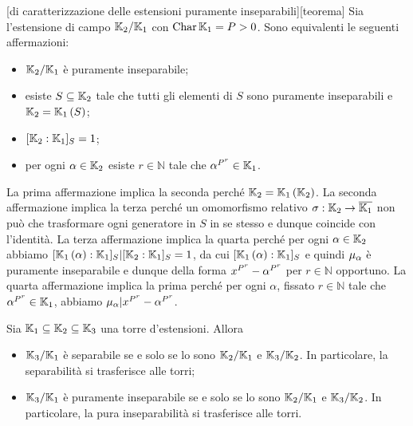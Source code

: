 \begin{Theorem}
	[di caratterizzazione delle estensioni puramente inseparabili][teorema] Sia l'estensione di campo $\mathbb{K}_2/\mathbb{K}_1$ con $\operatorname{Char}{\mathbb{K}_1} = P > 0$. Sono equivalenti le seguenti affermazioni:
	\begin{itemize}
		\item $\mathbb{K}_2/\mathbb{K}_1$ \`e puramente inseparabile;
		\item esiste $S \subseteq \mathbb{K}_2$ tale che tutti gli elementi di $S$ sono puramente inseparabili e $\mathbb{K}_2 = \mathbb{K}_1 \left ( S \right )$;
		\item $[\mathbb{K}_2:\mathbb{K}_1]_S = 1$;
		\item per ogni $\alpha \in \mathbb{K}_2$ esiste $r \in \mathbb{N}$ tale che $\alpha^{P^r} \in \mathbb{K}_1$.
	\end{itemize}
\end{Theorem}
\Proof La prima affermazione implica la seconda perch\'e $\mathbb{K}_2 = \mathbb{K}_1 \left ( \mathbb{K}_2 \right )$. La seconda affermazione implica la terza perch\'e un omomorfismo relativo $\sigma: \mathbb{K}_2 \rightarrow \overline{\mathbb{K}_1}$ non pu\`o che trasformare ogni generatore in $S$ in se stesso e dunque coincide con l'identit\`a. La terza affermazione implica la quarta perch\'e per ogni $\alpha \in \mathbb{K}_2$ abbiamo $[\mathbb{K}_1 \left ( \alpha \right ):\mathbb{K}_1]_S | [\mathbb{K}_2:\mathbb{K}_1]_S = 1$, da cui $[\mathbb{K}_1 \left ( \alpha \right ):\mathbb{K}_1]_S$ e quindi $\MinimalPolynomial{\alpha}$ \`e puramente inseparabile e dunque della forma $x^{P^r} - \alpha^{P^r}$ per $r \in \mathbb{N}$ opportuno. La quarta affermazione implica la prima perch\'e per ogni $\alpha$, fissato $r \in \mathbb{N}$ tale che $\alpha^{P^r} \in \mathbb{K}_1$, abbiamo $\MinimalPolynomial{\alpha} | x^{\Prime^r} - \alpha^{\Prime^r}$. \EndProof
\begin{Theorem}
	Sia $\mathbb{K}_1 \subseteq \mathbb{K}_2 \subseteq \mathbb{K}_3$ una torre d'estensioni. Allora
	\begin{itemize}
		\item $\mathbb{K}_3/\mathbb{K}_1$ \`e separabile se e solo se lo sono $\mathbb{K}_2/\mathbb{K}_1$ e $\mathbb{K}_3/\mathbb{K}_2$. In particolare, la separabilit\`a si trasferisce alle torri;
		\item $\mathbb{K}_3/\mathbb{K}_1$ \`e puramente inseparabile se e solo se lo sono $\mathbb{K}_2/\mathbb{K}_1$ e $\mathbb{K}_3/\mathbb{K}_2$. In particolare, la pura inseparabilit\`a si trasferisce alle torri.
	\end{itemize}
\end{Theorem}
